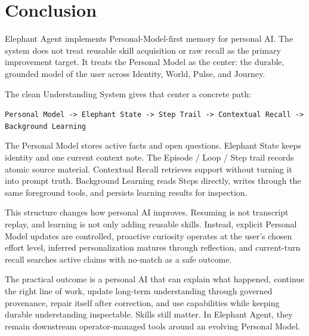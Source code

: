 \section{Conclusion}
\label{sec:conclusion}

Elephant Agent implements Personal-Model-first memory for personal AI. The
system does not treat reusable skill acquisition or raw recall as the primary
improvement target. It treats the Personal Model as the center: the durable,
grounded model of the user across Identity, World, Pulse, and Journey.

The clean Understanding System gives that center a concrete path:

\begin{center}
\texttt{Personal Model -> Elephant State -> Step Trail -> Contextual Recall -> Background Learning}
\end{center}

The Personal Model stores active facts and open questions. Elephant State keeps
identity and one current context note. The Episode / Loop / Step trail records
atomic source material. Contextual Recall retrieves support without turning it
into prompt truth. Background Learning reads Steps directly, writes through the
same foreground tools, and persists learning results for inspection.

This structure changes how personal AI improves. Resuming is not transcript
replay, and learning is not only adding reusable skills. Instead, explicit
Personal Model updates are controlled, proactive curiosity operates at the
user's chosen effort level, inferred personalization matures through reflection,
and current-turn recall searches active claims with no-match as a safe outcome.

The practical outcome is a personal AI that can explain what happened, continue
the right line of work, update long-term understanding through governed
provenance, repair itself after correction, and use capabilities while keeping
durable understanding inspectable. Skills still matter. In Elephant Agent, they remain
downstream operator-managed tools around an evolving Personal Model.
